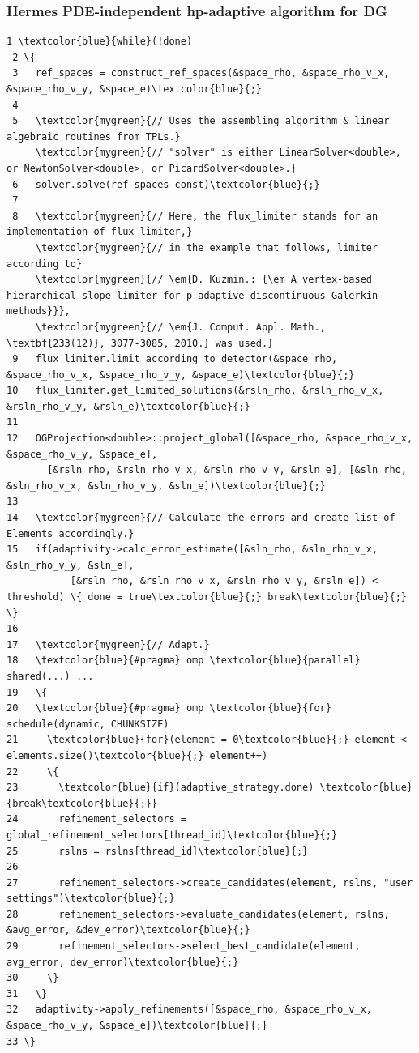 \documentclass{beamer}
\begin{document}
\def\Tinyc{\fontsize{5pt}{0pt}\selectfont}
\begin{frame}[fragile]
\frametitle{Hermes PDE-independent hp-adaptive algorithm for DG}
\begin{Verbatim}[commandchars=\\\{\}, fontsize=\Tinyc]
 1 \textcolor{blue}{while}(!done)
 2 \{
 3   ref_spaces = construct_ref_spaces(&space_rho, &space_rho_v_x, &space_rho_v_y, &space_e)\textcolor{blue}{;}
 4
 5   \textcolor{mygreen}{// Uses the assembling algorithm & linear algebraic routines from TPLs.}
     \textcolor{mygreen}{// "solver" is either LinearSolver<double>, or NewtonSolver<double>, or PicardSolver<double>.}
 6   solver.solve(ref_spaces_const)\textcolor{blue}{;}
 7   
 8   \textcolor{mygreen}{// Here, the flux_limiter stands for an implementation of flux limiter,}
     \textcolor{mygreen}{// in the example that follows, limiter according to}
     \textcolor{mygreen}{// \em{D. Kuzmin.: {\em A vertex-based hierarchical slope limiter for p-adaptive discontinuous Galerkin methods}}}, 
     \textcolor{mygreen}{// \em{J. Comput. Appl. Math., \textbf{233(12)}, 3077-3085, 2010.} was used.}
 9   flux_limiter.limit_according_to_detector(&space_rho, &space_rho_v_x, &space_rho_v_y, &space_e)\textcolor{blue}{;}
10   flux_limiter.get_limited_solutions(&rsln_rho, &rsln_rho_v_x, &rsln_rho_v_y, &rsln_e)\textcolor{blue}{;}
11
12   OGProjection<double>::project_global([&space_rho, &space_rho_v_x, &space_rho_v_y, &space_e],
       [&rsln_rho, &rsln_rho_v_x, &rsln_rho_v_y, &rsln_e], [&sln_rho, &sln_rho_v_x, &sln_rho_v_y, &sln_e])\textcolor{blue}{;}
13
14   \textcolor{mygreen}{// Calculate the errors and create list of Elements accordingly.}
15   if(adaptivity->calc_error_estimate([&sln_rho, &sln_rho_v_x, &sln_rho_v_y, &sln_e],
           [&rsln_rho, &rsln_rho_v_x, &rsln_rho_v_y, &rsln_e]) < threshold) \{ done = true\textcolor{blue}{;} break\textcolor{blue}{;} \}
16 
17   \textcolor{mygreen}{// Adapt.}
18   \textcolor{blue}{#pragma} omp \textcolor{blue}{parallel} shared(...) ...
19   \{
20   \textcolor{blue}{#pragma} omp \textcolor{blue}{for} schedule(dynamic, CHUNKSIZE)
21     \textcolor{blue}{for}(element = 0\textcolor{blue}{;} element < elements.size()\textcolor{blue}{;} element++)
22     \{
23       \textcolor{blue}{if}(adaptive_strategy.done) \textcolor{blue}{break\textcolor{blue}{;}}
24       refinement_selectors = global_refinement_selectors[thread_id]\textcolor{blue}{;}
25       rslns = rslns[thread_id]\textcolor{blue}{;}
26       
27       refinement_selectors->create_candidates(element, rslns, "user settings")\textcolor{blue}{;}
28       refinement_selectors->evaluate_candidates(element, rslns, &avg_error, &dev_error)\textcolor{blue}{;}
29       refinement_selectors->select_best_candidate(element, avg_error, dev_error)\textcolor{blue}{;}
30     \}
31   \}
32   adaptivity->apply_refinements([&space_rho, &space_rho_v_x, &space_rho_v_y, &space_e])\textcolor{blue}{;}
33 \}
\end{Verbatim}
\end{frame}
\end{document}
